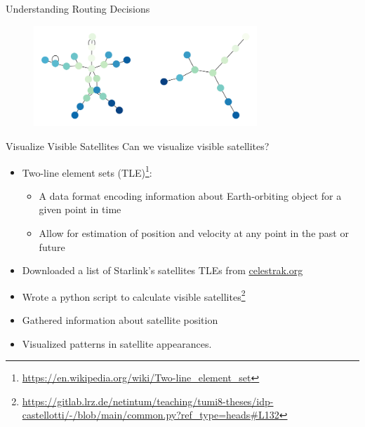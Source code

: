 \documentclass[NET,english,beameralt]{tumbeamer}
\begin{document}
\begin{frame}{Understanding Routing Decisions}
    \begin{figure}
        \includegraphics[width=0.75\textwidth]{pics/aws_7_icmp.png}
    \end{figure}
\end{frame}

\begin{frame}{Visualize Visible Satellites}
    Can we visualize visible satellites?
    \begin{itemize}
        \item Two-line element sets (TLE)\footnote{\url{https://en.wikipedia.org/wiki/Two-line_element_set}}: 
        \begin{itemize} 
            \item A data format encoding information about Earth-orbiting object for a given point in time
            \item Allow for estimation of position and velocity at any point in the past or future
        \end{itemize}     
        \item Downloaded a list of Starlink's satellites TLEs from \href{celestrak.org}{celestrak.org}
        \item Wrote a python script to calculate visible
        satellites\footnote{\url{https://gitlab.lrz.de/netintum/teaching/tumi8-theses/idp-castellotti/-/blob/main/common.py?ref_type=heads\#L132}}
        \item Gathered information about satellite position
        \item Visualized patterns in satellite appearances.
    \end{itemize}
\end{frame}
\end{document}
